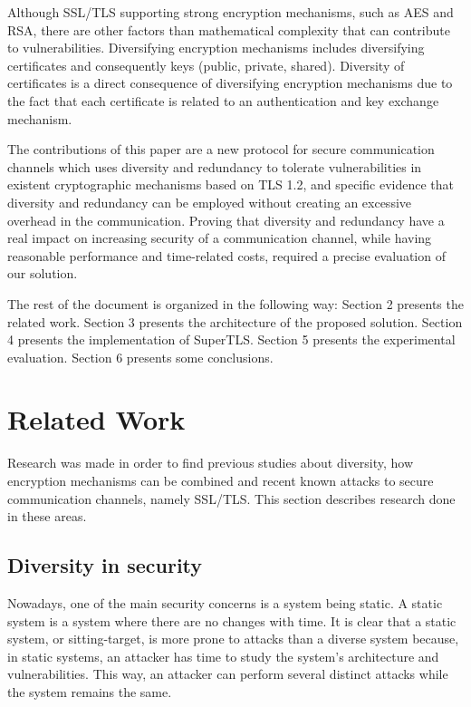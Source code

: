 \documentclass{sig-alternate-05-2015}
\begin{document}
Although SSL/TLS supporting strong encryption mechanisms, such as AES and RSA, there are other factors than mathematical complexity that can contribute to vulnerabilities.
Diversifying encryption mechanisms includes diversifying certificates and consequently keys (public, private, shared).
Diversity of certificates is a direct consequence of diversifying encryption mechanisms due to the fact that each certificate is related to an authentication and key exchange mechanism.

The contributions of this paper are a new protocol for secure communication channels which uses diversity and redundancy to tolerate vulnerabilities in existent cryptographic mechanisms based on TLS 1.2, and specific evidence that diversity and redundancy can be employed without creating an excessive overhead in the communication. Proving that diversity and redundancy have a real impact on increasing security of a communication channel, while having reasonable performance and time-related costs, required a precise evaluation of our solution.

The rest of the document is organized in the following way: Section 2 presents the related work. Section 3 presents the architecture of the proposed solution. Section 4 presents the implementation of SuperTLS. Section 5 presents the experimental evaluation. Section 6 presents some conclusions.

\section{Related Work}
\label{sec-related-work}

Research was made in order to find previous studies about diversity, how encryption mechanisms can be combined and recent known attacks to secure communication channels, namely SSL/TLS. This section describes research done in these areas.

\subsection{Diversity in security}

Nowadays, one of the main security concerns is a system being static. A static system is a system where there are no changes with time. It is clear that a static system, or sitting-target, is more prone to attacks than a diverse system because, in static systems, an attacker has time to study the system's architecture and vulnerabilities.
This way, an attacker can perform several distinct attacks while the system remains the same.
\end{document}
